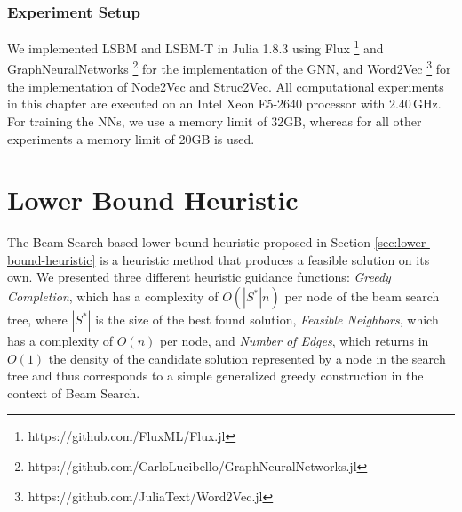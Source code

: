 \documentclass[draft,final]{vutinfth} %
\begin{document}
\subsubsection{Experiment Setup}
We implemented LSBM and LSBM-T in Julia 1.8.3 using Flux \footnote{https://github.com/FluxML/Flux.jl} and GraphNeuralNetworks \footnote{https://github.com/CarloLucibello/GraphNeuralNetworks.jl}\cite{Lucibello2021GNN} for the implementation of the GNN, and Word2Vec \footnote{https://github.com/JuliaText/Word2Vec.jl} for the implementation of Node2Vec and Struc2Vec. All computational experiments in this chapter are executed on an Intel Xeon E5-2640 processor with 2.40\,GHz. For training the NNs, we use a memory limit of 32GB, whereas for all other experiments a memory limit of 20GB is used. 



\section{Lower Bound Heuristic}\label{sec:lbh}
The Beam Search based lower bound heuristic proposed in Section \ref{sec:lower-bound-heuristic} is a heuristic method that produces a feasible solution on its own. We presented three different heuristic guidance functions: \emph{Greedy Completion}, which has a complexity of $O(|S^*|n)$ per node of the beam search tree, where $|S^*|$ is the size of the best found solution, \emph{Feasible Neighbors}, which has a complexity of $O(n)$ per node, and \emph{Number of Edges}, which returns in $O(1)$ the density of the candidate solution represented by a node in the search tree and thus corresponds to a simple generalized greedy construction in the context of Beam Search. 
\end{document}
